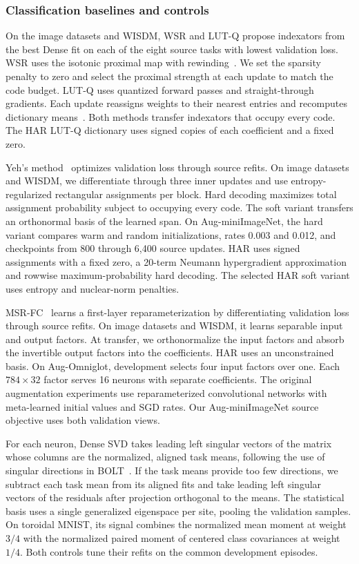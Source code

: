 \subsubsection{Classification baselines and controls}

On the image datasets and WISDM, WSR and LUT-Q propose indexators from
the best Dense fit on each of the eight source tasks with lowest
validation loss. WSR uses the isotonic proximal map with
rewinding~\citep{shakerinava2024weight}. We set the sparsity penalty to
zero and select the proximal strength at each update to match the code
budget. LUT-Q uses quantized forward passes and straight-through
gradients. Each update reassigns weights to their nearest entries and
recomputes dictionary means~\citep{cardinaux2018iteratively}. Both
methods transfer indexators that occupy every code. The HAR LUT-Q
dictionary uses signed copies of each coefficient and a fixed zero.

Yeh's method~\citep{yeh2022equivariance} optimizes validation loss
through source refits. On image datasets and WISDM, we differentiate
through three inner updates and use entropy-regularized rectangular
assignments per block. Hard decoding maximizes total assignment
probability subject to occupying every code. The soft variant
transfers an orthonormal basis of the learned span. On Aug-miniImageNet,
the hard variant compares warm and random initializations, rates
0.003 and 0.012, and checkpoints from 800 through 6,400 source
updates. HAR uses signed assignments with a fixed zero, a 20-term
Neumann hypergradient approximation and rowwise maximum-probability
hard decoding. The selected HAR soft variant uses entropy and
nuclear-norm penalties.

MSR-FC~\citep{zhou2021meta} learns a first-layer reparameterization by
differentiating validation loss through source refits. On image
datasets and WISDM, it learns separable input and output factors. At
transfer, we orthonormalize the input factors and absorb the invertible
output factors into the coefficients. HAR uses an unconstrained basis.
On Aug-Omniglot, development selects four input factors over one. Each
$784\times32$ factor serves 16 neurons with separate coefficients.
The original augmentation experiments use reparameterized convolutional
networks with meta-learned initial values and SGD rates. Our
Aug-miniImageNet source objective uses both validation views.

\label{app:spectral-controls}
For each neuron, Dense SVD takes leading left singular vectors of the
matrix whose columns are the normalized, aligned task means, following
the use of singular directions in BOLT~\citep{park2026bolt}. If the task means
provide too few directions, we subtract each task mean from its
aligned fits and take leading left singular vectors of the residuals
after projection orthogonal to the means. The statistical basis uses a
single generalized eigenspace per site, pooling the validation samples.
On toroidal MNIST, its signal combines the normalized mean moment at
weight $3/4$ with the normalized paired moment of centered class
covariances at weight $1/4$. Both controls tune their refits on the
common development episodes.

